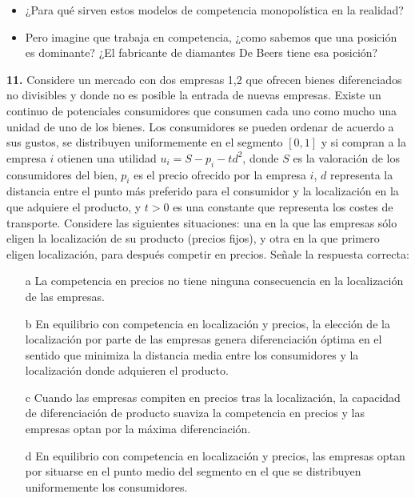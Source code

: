 \documentclass{nuevotema}
\begin{document}
\conceptos

\preguntas



\begin{itemize}
    \item ¿Para qué sirven estos modelos de competencia monopolística en la realidad?
    
    \item Pero imagine que trabaja en competencia, ¿como sabemos que una posición es dominante? ¿El fabricante de diamantes De Beers tiene esa posición?
\end{itemize}



\textbf{11.} Considere un mercado con dos empresas 1,2 que ofrecen bienes diferenciados no divisibles y donde no es posible la entrada de nuevas empresas. Existe un continuo de potenciales consumidores que consumen cada uno como mucho una unidad de uno de los bienes. Los consumidores se pueden ordenar de acuerdo a sus gustos, se distribuyen uniformemente en el segmento $\left[ 0,1 \right]$ y si compran a la empresa $i$ otienen una utilidad $u_i = S - p_i - td^2$, donde $S$ es la valoración de los consumidores del bien, $p_i$ es el precio ofrecido por la empresa $i$, $d$ representa la distancia entre el punto más preferido para el consumidor y la localización en la que adquiere el producto, y $t > 0$ es una constante que representa los costes de transporte. Considere las siguientes situaciones: una en la que las empresas sólo eligen la localización de su producto (precios fijos), y otra en la que primero eligen localización, para después competir en precios. Señale la respuesta correcta:

\begin{itemize}
	\item[a] La competencia en precios no tiene ninguna consecuencia en la localización de las empresas.
	\item[b] En equilibrio con competencia en localización y precios, la elección de la localización por parte de las empresas genera diferenciación óptima en el sentido que minimiza la distancia media entre los consumidores y la localización donde adquieren el producto.
	\item[c] Cuando las empresas compiten en precios tras la localización, la capacidad de diferenciación de producto suaviza la competencia en precios y las empresas optan por la máxima diferenciación.
	\item[d] En equilibrio con competencia en localización y precios, las empresas optan por situarse en el punto medio del segmento en el que se distribuyen uniformemente los consumidores.
\end{itemize}
\end{document}
